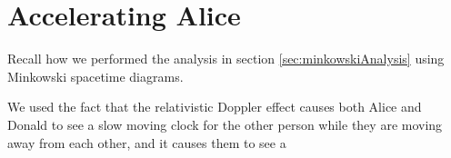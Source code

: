 \section{Accelerating Alice}\label{sec:acceleratingAlice}
	Recall how we performed the analysis in section \vref{sec:minkowskiAnalysis} using Minkowski spacetime diagrams.

	We used the fact that the relativistic Doppler effect causes both Alice and Donald to see a slow moving clock for the other person while they are moving away from each other, and it causes them to see a 
